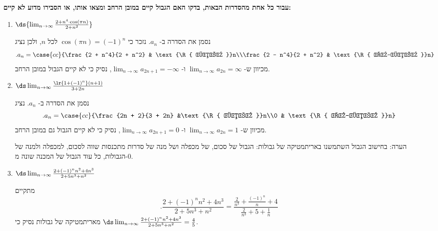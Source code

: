 \textbf{ עבור כל אחת מהסדרות הבאות, בדקו האם הגבול קיים במובן הרחב ומצאו אותו, או הסבירו מדוע לא קיים:}

\begin{enumerate}
\item  $\ds{\lim_{n \to \infty} \frac{2 + n^4 \cdot \cos(\pi n)}{2 + n^2}}$
\begin{solbox}
 נסמן את הסדרה ב-
$a_n$.
נזכר כי
$\cos(\pi n)=(-1)^{n}$
לכל
$n$,
ולכן
נציג
$$.a_n=\case{cc}{\frac{2 + n^4}{2 + n^2} & \text{\R{ זוגי }}n\\\frac{2 - n^4}{2 + n^2} & \text{\R{ אי-זוגי }}n}$$
מכיוון ש-
$\lim_{n\to\infty}a_{2n}=\infty$
ו-
$\lim_{n\to \infty}a_{2n+1}=-\infty$,
נסיק כי לא קיים הגבול
במובן הרחב.

\end{solbox}
\item $\ds\lim_{n \to \infty} \frac{\lr{1 + (-1)^n}(n+1)}{3 + 2n}$
\begin{solbox}
 נסמן את הסדרה ב-
$a_n$.
נציג
$$.a_n=\case{cc}{\frac{2n + 2}{3 + 2n} &\text{\R{ זוגי }}n\\0 & \text{\R{ אי-זוגי }}n}$$
מכיוון ש-
$\displaystyle\lim_{n\to\infty}a_{2n}=1$
ו-
$\displaystyle\lim_{n\to \infty}a_{2n+1}=0$,
נסיק כי לא קיים הגבול גם במובן הרחב.

הערה: בחישוב הגבול השתמשנו באריתמטיקה של גבולות: הגבול של סכום, של מכפלה ושל מנה של סדרות מתכנסות שווה לסכום, למכפלה ולמנה של הגבולות, כל עוד הגבול של המכנה שונה מ-$0$.
\end{solbox}
\item $\ds\lim_{n \to \infty} \frac{2 + (-1)^n n^2 + 4n^3}{2 + 5n^3 + n^2}$
\begin{solbox}
     מתקיים
$$.\frac{2 + (-1)^n n^2 + 4n^3}{2 + 5n^3 + n^2}=\frac{\frac{2}{n^3} + \frac{(-1)^n}{n} + 4}{\frac{2}{n^3} + 5 + \frac{1}{n}}$$
מאריתמטיקה של גבולות נסיק כי
$\ds\lim_{n \to \infty} \frac{2 + (-1)^n n^2 + 4n^3}{2 + 5n^3 + n^2}=\frac{4}{5}$.

\end{solbox}
\eMs
\end{enumerate}
